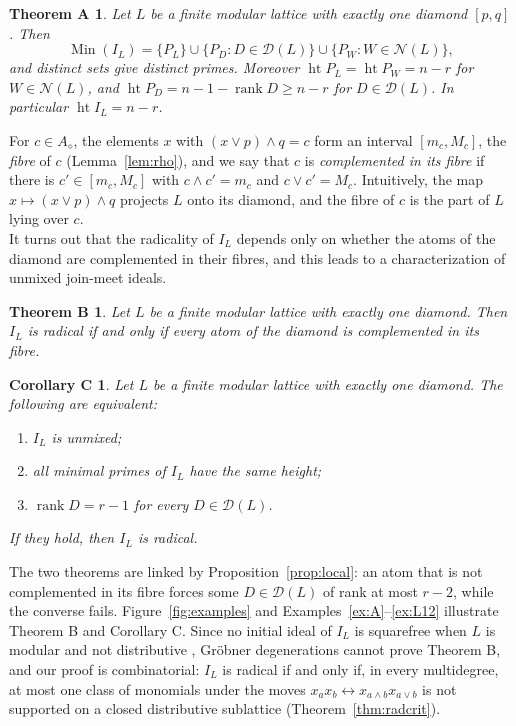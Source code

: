 \documentclass{amsart}
\newtheorem*{theoremA}{Theorem A}
\newtheorem*{theoremB}{Theorem B}
\newtheorem*{corollaryC}{Corollary C}
\theoremstyle{definition}
\DeclareMathOperator{\rk}{rank}
\DeclareMathOperator{\htop}{ht}
\DeclareMathOperator{\Min}{Min}
\newcommand{\cD}{\mathcal D}
\newcommand{\cN}{\mathcal N}
\newcommand{\dm}{\diamond}
\begin{document}
\begin{theoremA}
	Let $L$ be a finite modular lattice with exactly one diamond $[p,q]$. Then
	\[
	\Min(I_L)=\{P_L\}\cup\{P_D : D\in\cD(L)\}\cup\{P_W : W\in\cN(L)\},
	\]
	and distinct sets give distinct primes. Moreover $\htop P_L=\htop P_W=n-r$ for $W\in\cN(L)$, and $\htop P_D=n-1-\rk D\ge n-r$ for $D\in\cD(L)$. In particular $\htop I_L=n-r$.
\end{theoremA}

For $c\in A_\dm$, the elements $x$ with $(x\vee p)\wedge q=c$ form an interval $[m_c,M_c]$, the \emph{fibre} of $c$ (Lemma~\ref{lem:rho}), and we say that $c$ is \emph{complemented in its fibre} if there is $c'\in[m_c,M_c]$ with $c\wedge c'=m_c$ and $c\vee c'=M_c$. Intuitively, the map $x\mapsto(x\vee p)\wedge q$ projects $L$ onto its diamond, and the fibre of $c$ is the part of $L$ lying over $c$.\\
It turns out that the radicality of $I_L$ depends only on whether the atoms of the diamond are complemented in their fibres, and this leads to a characterization of unmixed join-meet ideals.

\begin{theoremB}
	Let $L$ be a finite modular lattice with exactly one diamond. Then $I_L$ is radical if and only if every atom of the diamond is complemented in its fibre.
\end{theoremB}

\begin{corollaryC}
	Let $L$ be a finite modular lattice with exactly one diamond. The following are equivalent:
	\begin{enumerate}
		\item[(a)] $I_L$ is unmixed;
		\item[(b)] all minimal primes of $I_L$ have the same height;
		\item[(c)] $\rk D=r-1$ for every $D\in\cD(L)$.
	\end{enumerate}
	If they hold, then $I_L$ is radical.
\end{corollaryC}

The two theorems are linked by Proposition~\ref{prop:local}: an atom that is not complemented in its fibre forces some $D\in\cD(L)$ of rank at most $r-2$, while the converse fails. Figure~\ref{fig:examples} and Examples~\ref{ex:A}--\ref{ex:L12} illustrate Theorem B and Corollary C. Since no initial ideal of $I_L$ is squarefree when $L$ is modular and not distributive \cite[Theorem 1.3]{EH}, Gr\"obner degenerations cannot prove Theorem B, and our proof is combinatorial: $I_L$ is radical if and only if, in every multidegree, at most one class of monomials under the moves $x_ax_b\leftrightarrow x_{a\wedge b}x_{a\vee b}$ is not supported on a closed distributive sublattice (Theorem~\ref{thm:radcrit}).
\end{document}
